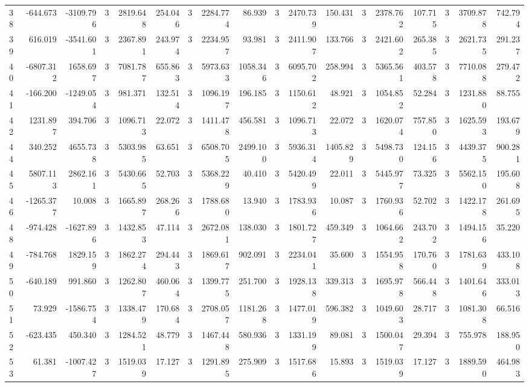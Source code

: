\begin{table}[ht]
\begin{tabular}{lrrrrrrrrrrrrrrrrr}
38 & -644.673 & -3109.796 & 3 & 2819.648 & 254.046 & 3 & 2284.774 & 86.939 & 3 & 2470.739 & 150.431 & 3 & 2378.762 & 107.715 & 3 & 3709.878 & 742.794 \\
39 & 616.019 & -3541.601 & 3 & 2367.891 & 243.974 & 3 & 2234.957 & 93.981 & 3 & 2411.907 & 133.766 & 3 & 2421.602 & 265.385 & 3 & 2621.735 & 291.237 \\
40 & -6807.312 & 1658.697 & 3 & 7081.787 & 655.863 & 3 & 5973.633 & 1058.346 & 3 & 6095.702 & 258.994 & 3 & 5365.561 & 403.578 & 3 & 7710.088 & 279.472 \\
41 & -166.200 & -1249.054 & 3 & 981.371 & 132.514 & 3 & 1096.197 & 196.185 & 3 & 1150.612 & 48.921 & 3 & 1054.852 & 52.284 & 3 & 1231.880 & 88.755 \\
42 & 1231.897 & 394.706 & 3 & 1096.713 & 22.072 & 3 & 1411.478 & 456.581 & 3 & 1096.713 & 22.072 & 3 & 1620.074 & 757.850 & 3 & 1625.593 & 193.679 \\
44 & 340.252 & 4655.738 & 3 & 5303.985 & 63.651 & 3 & 6508.705 & 2499.100 & 3 & 5936.314 & 1405.829 & 3 & 5498.730 & 124.156 & 3 & 4439.375 & 900.281 \\
45 & 5807.113 & 2862.161 & 3 & 5430.665 & 52.703 & 3 & 5368.229 & 40.410 & 3 & 5420.499 & 22.011 & 3 & 5445.977 & 73.325 & 3 & 5562.150 & 195.608 \\
46 & -1265.377 & 10.008 & 3 & 1665.897 & 268.266 & 3 & 1788.680 & 13.940 & 3 & 1783.936 & 10.087 & 3 & 1760.936 & 52.702 & 3 & 1422.178 & 261.695 \\
48 & -974.428 & -1627.896 & 3 & 1432.853 & 47.114 & 3 & 2672.081 & 138.030 & 3 & 1801.727 & 459.349 & 3 & 1064.662 & 243.702 & 3 & 1494.156 & 35.220 \\
49 & -784.768 & 1829.159 & 3 & 1862.274 & 294.443 & 3 & 1869.617 & 902.091 & 3 & 2234.041 & 35.600 & 3 & 1554.958 & 170.760 & 3 & 1781.639 & 433.108 \\
50 & -640.189 & 991.860 & 3 & 1262.807 & 460.064 & 3 & 1399.775 & 251.700 & 3 & 1928.138 & 339.313 & 3 & 1695.978 & 566.448 & 3 & 1401.646 & 333.013 \\
51 & 73.929 & -1586.754 & 3 & 1338.479 & 170.684 & 3 & 2708.057 & 1181.268 & 3 & 1477.019 & 596.382 & 3 & 1049.603 & 28.717 & 3 & 1081.308 & 66.516 \\
52 & -623.435 & 450.340 & 3 & 1284.521 & 48.779 & 3 & 1467.448 & 580.936 & 3 & 1331.199 & 89.081 & 3 & 1500.047 & 29.394 & 3 & 755.978 & 188.950 \\
53 & 61.381 & -1007.427 & 3 & 1519.039 & 17.127 & 3 & 1291.895 & 275.909 & 3 & 1517.686 & 15.893 & 3 & 1519.039 & 17.127 & 3 & 1889.590 & 464.983 \\

\end{tabular}
\end{table}
